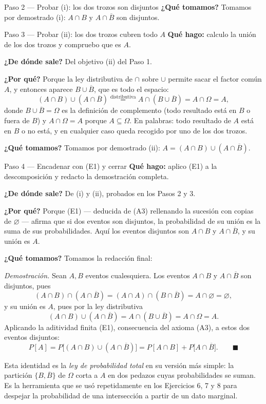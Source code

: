 \documentclass[11pt]{article}
\begin{document}
\begin{sol}
\begin{paso}{Paso 2 --- Probar (i): los dos trozos son disjuntos}
\textbf{¿Qué tomamos?} Tomamos por demostrado (i): $A\cap B$ y $A\cap\overline{B}$ son
disjuntos.
\end{paso}

\begin{paso}{Paso 3 --- Probar (ii): los dos trozos cubren todo $A$}
\textbf{Qué hago:} calculo la unión de los dos trozos y compruebo que es $A$.

\textbf{¿De dónde sale?} Del objetivo (ii) del Paso 1.

\textbf{¿Por qué?} Porque la ley distributiva de $\cap$ sobre $\cup$ permite sacar el factor
común $A$, y entonces aparece $B\cup\overline{B}$, que es todo el espacio:
\[
(A\cap B)\cup(A\cap\overline{B})
\overset{\text{distributiva}}{=}A\cap(B\cup\overline{B})
=A\cap\Omega
=A ,
\]
donde $B\cup\overline{B}=\Omega$ es la definición de complemento (todo resultado está en $B$ o
fuera de $B$) y $A\cap\Omega=A$ porque $A\subseteq\Omega$. En palabras: todo resultado de $A$
está en $B$ o no está, y en cualquier caso queda recogido por uno de los dos trozos.

\textbf{¿Qué tomamos?} Tomamos por demostrado (ii): $A=(A\cap B)\cup(A\cap\overline{B})$.
\end{paso}

\begin{paso}{Paso 4 --- Encadenar con (E1) y cerrar}
\textbf{Qué hago:} aplico (E1) a la descomposición y redacto la demostración completa.

\textbf{¿De dónde sale?} De (i) y (ii), probados en los Pasos 2 y 3.

\textbf{¿Por qué?} Porque (E1) --- deducida de (A3) rellenando la sucesión con copias de
$\varnothing$ --- afirma que si dos eventos son disjuntos, la probabilidad de su unión es la
suma de sus probabilidades. Aquí los eventos disjuntos son $A\cap B$ y $A\cap\overline{B}$, y su
unión es $A$.

\textbf{¿Qué tomamos?} Tomamos la redacción final:

\medskip
\emph{Demostración.} Sean $A,B$ eventos cualesquiera. Los eventos $A\cap B$ y $A\cap\overline{B}$
son disjuntos, pues
\[
(A\cap B)\cap(A\cap\overline{B})=(A\cap A)\cap(B\cap\overline{B})=A\cap\varnothing=\varnothing ,
\]
y su unión es $A$, pues por la ley distributiva
\[
(A\cap B)\cup(A\cap\overline{B})=A\cap(B\cup\overline{B})=A\cap\Omega=A .
\]
Aplicando la aditividad finita (E1), consecuencia del axioma (A3), a estos dos eventos
disjuntos:
\[
P[A]=P\big[(A\cap B)\cup(A\cap\overline{B})\big]=P[A\cap B]+P\big[A\cap\overline{B}\big].
\qquad\blacksquare
\]
\end{paso}

\begin{nota}
Esta identidad es la \emph{ley de probabilidad total} en su versión más simple: la partición
$\{B,\overline{B}\}$ de $\Omega$ corta a $A$ en dos pedazos cuyas probabilidades se suman. Es la
herramienta que se usó repetidamente en los Ejercicios 6, 7 y 8 para despejar la probabilidad de
una intersección a partir de un dato marginal.
\end{nota}

\end{sol}
\end{document}
